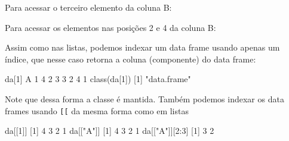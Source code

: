 \documentclass[
  10pt,
  a4paper]{book}
\newenvironment{Shaded}{\begin{snugshade}}{\end{snugshade}}
\newcommand{\ConstantTok}[1]{\textcolor[rgb]{0.00,0.00,0.00}{#1}}
\newcommand{\DecValTok}[1]{\textcolor[rgb]{0.00,0.00,0.81}{#1}}
\newcommand{\FunctionTok}[1]{\textcolor[rgb]{0.00,0.00,0.00}{#1}}
\newcommand{\NormalTok}[1]{#1}
\newcommand{\SpecialCharTok}[1]{\textcolor[rgb]{0.00,0.00,0.00}{#1}}
\newcommand{\StringTok}[1]{\textcolor[rgb]{0.31,0.60,0.02}{#1}}
\begin{document}
\begin{Shaded}
\end{Shaded}

Para acessar o terceiro elemento da coluna B:

\begin{Shaded}
\end{Shaded}

Para acessar os elementos nas posições 2 e 4 da coluna B:

\begin{Shaded}
\end{Shaded}

Assim como nas listas, podemos indexar um data frame usando apenas um
índice, que nesse caso retorna a coluna (componente) do data frame:

\begin{Shaded}
\begin{Highlighting}[]
\NormalTok{da[}\DecValTok{1}\NormalTok{]}
\NormalTok{  A}
\DecValTok{1} \DecValTok{4}
\DecValTok{2} \DecValTok{3}
\DecValTok{3} \DecValTok{2}
\DecValTok{4} \DecValTok{1}
\FunctionTok{class}\NormalTok{(da[}\DecValTok{1}\NormalTok{])}
\NormalTok{[}\DecValTok{1}\NormalTok{] }\StringTok{"data.frame"}
\end{Highlighting}
\end{Shaded}

Note que dessa forma a classe é mantida. Também podemos indexar os data
frames usando \texttt{{[}{[}} da mesma forma como em listas

\begin{Shaded}
\begin{Highlighting}[]
\NormalTok{da[[}\DecValTok{1}\NormalTok{]]}
\NormalTok{[}\DecValTok{1}\NormalTok{] }\DecValTok{4} \DecValTok{3} \DecValTok{2} \DecValTok{1}
\NormalTok{da[[}\StringTok{"A"}\NormalTok{]]}
\NormalTok{[}\DecValTok{1}\NormalTok{] }\DecValTok{4} \DecValTok{3} \DecValTok{2} \DecValTok{1}
\NormalTok{da[[}\StringTok{"A"}\NormalTok{]][}\DecValTok{2}\SpecialCharTok{:}\DecValTok{3}\NormalTok{]}
\NormalTok{[}\DecValTok{1}\NormalTok{] }\DecValTok{3} \DecValTok{2}
\end{Highlighting}
\end{Shaded}
\end{document}
